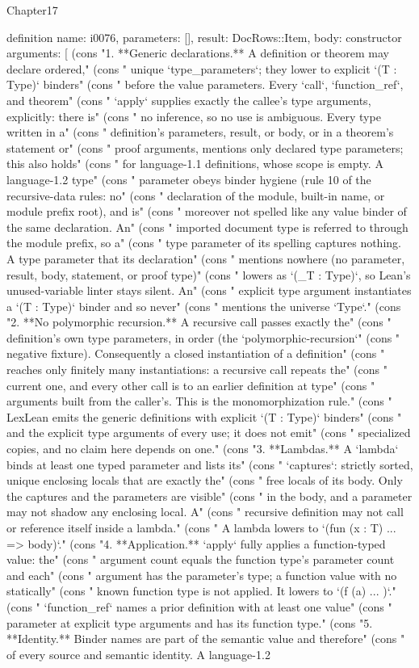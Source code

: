 \begin{lexlean}{Chapter17}
\begin{semanticmodule}
definition{
  name: i0076,
  parameters: [],
  result: DocRows::Item,
  body: constructor{
    arguments: [
      (cons "1. **Generic declarations.** A definition or theorem may declare ordered," (cons "   unique `type_parameters`; they lower to explicit `(T : Type)` binders" (cons "   before the value parameters. Every `call`, `function_ref`, and theorem" (cons "   `apply` supplies exactly the callee's type arguments, explicitly: there is" (cons "   no inference, so no use is ambiguous. Every type written in a" (cons "   definition's parameters, result, or body, or in a theorem's statement or" (cons "   proof arguments, mentions only declared type parameters; this also holds" (cons "   for language-1.1 definitions, whose scope is empty. A language-1.2 type" (cons "   parameter obeys binder hygiene (rule 10 of the recursive-data rules: no" (cons "   declaration of the module, built-in name, or module prefix root), and is" (cons "   moreover not spelled like any value binder of the same declaration. An" (cons "   imported document type is referred to through the module prefix, so a" (cons "   type parameter of its spelling captures nothing. A type parameter that its declaration" (cons "   mentions nowhere (no parameter, result, body, statement, or proof type)" (cons "   lowers as `(_T : Type)`, so Lean's unused-variable linter stays silent. An" (cons "   explicit type argument instantiates a `(T : Type)` binder and so never" (cons "   mentions the universe `Type`." (cons "2. **No polymorphic recursion.** A recursive call passes exactly the" (cons "   definition's own type parameters, in order (the `polymorphic-recursion`" (cons "   negative fixture). Consequently a closed instantiation of a definition" (cons "   reaches only finitely many instantiations: a recursive call repeats the" (cons "   current one, and every other call is to an earlier definition at type" (cons "   arguments built from the caller's. This is the monomorphization rule." (cons "   LexLean emits the generic definitions with explicit `(T : Type)` binders" (cons "   and the explicit type arguments of every use; it does not emit" (cons "   specialized copies, and no claim here depends on one." (cons "3. **Lambdas.** A `lambda` binds at least one typed parameter and lists its" (cons "   `captures`: strictly sorted, unique enclosing locals that are exactly the" (cons "   free locals of its body. Only the captures and the parameters are visible" (cons "   in the body, and a parameter may not shadow any enclosing local. A" (cons "   recursive definition may not call or reference itself inside a lambda." (cons "   A lambda lowers to `(fun (x : T) ... => body)`." (cons "4. **Application.** `apply` fully applies a function-typed value: the" (cons "   argument count equals the function type's parameter count and each" (cons "   argument has the parameter's type; a function value with no statically" (cons "   known function type is not applied. It lowers to `(f (a) ... )`." (cons "   `function_ref` names a prior definition with at least one value" (cons "   parameter at explicit type arguments and has its function type." (cons "5. **Identity.** Binder names are part of the semantic value and therefore" (cons "   of every source and semantic identity. A language-1.2 }}
\end{semanticmodule}
\end{lexlean}
